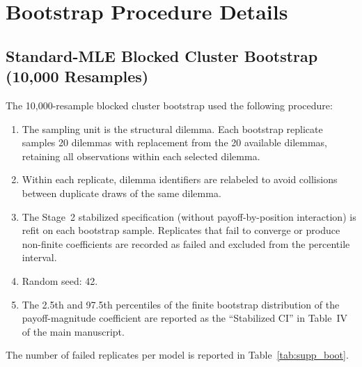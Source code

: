 \documentclass[10pt,journal,compsoc]{IEEEtran}
\begin{document}
\section{Bootstrap Procedure Details}

\subsection{Standard-MLE Blocked Cluster Bootstrap (10,000 Resamples)}
The 10,000-resample blocked cluster bootstrap used the following procedure:

\begin{enumerate}
  \item The sampling unit is the structural dilemma. Each bootstrap replicate samples 20 dilemmas with replacement from the 20 available dilemmas, retaining all observations within each selected dilemma.
  \item Within each replicate, dilemma identifiers are relabeled to avoid collisions between duplicate draws of the same dilemma.
  \item The Stage~2 stabilized specification (without payoff-by-position interaction) is refit on each bootstrap sample. Replicates that fail to converge or produce non-finite coefficients are recorded as failed and excluded from the percentile interval.
  \item Random seed: 42.
  \item The 2.5th and 97.5th percentiles of the finite bootstrap distribution of the payoff-magnitude coefficient are reported as the ``Stabilized CI'' in Table~IV of the main manuscript.
\end{enumerate}

The number of failed replicates per model is reported in Table~\ref{tab:supp_boot}.

\begin{table}[!h]
\centering
\caption{Bootstrap Replicate Summary (Stabilized Specification)}
\label{tab:supp_boot}
\small
{}
\end{table}
\end{document}
